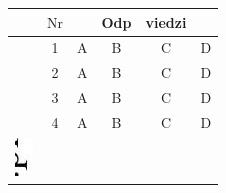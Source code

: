 \documentclass[10pt]{article}
\begin{document}
\begin{center}
\begin{tabular}{|c|c|c|c|c|c|}
\hline
 & \( \mathrm{Nr} \) &  & Odp & viedzi &  \\
\hline
 & 1 & A & B & C & D \\
\hline
 & 2 & A & B & C & D \\
\hline
 & 3 & A & B & C & D \\
\hline
 & 4 & A & B & C & D \\
\hline
\includegraphics[max width=\textwidth]{2024_11_21_1e89351873aa60c4c1b9g-23(2)}

\end{tabular}
\end{center}
\end{document}
